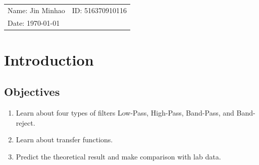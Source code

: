 \documentclass{article}
\begin{document}
\vspace*{0.25cm}
\hrulefill
\thispagestyle{empty}

\begin{center}
\begin{large}
\end{large}

\hrulefill

\vspace*{5cm}
\begin{Large}
\end{Large}

\vspace{2em}

\begin{large}
\end{large}
\end{center}


\vfill

\begin{table}[h!]
\flushleft
\begin{tabular}{ll}
Name: Jin Minhao \hspace*{2em}&
ID: 516370910116\hspace*{2em}\\





Date: \today

\end{tabular}
\end{table}


\newpage
\section{Introduction}
\subsection{Objectives}
\begin{enumerate}
	\item  Learn about four types of filters Low-Pass, High-Pass, Band-Pass, and Band-reject.
	\item Learn about transfer functions.
	\item Predict the theoretical result and make comparison with lab data.
\end{enumerate}
\end{document}
